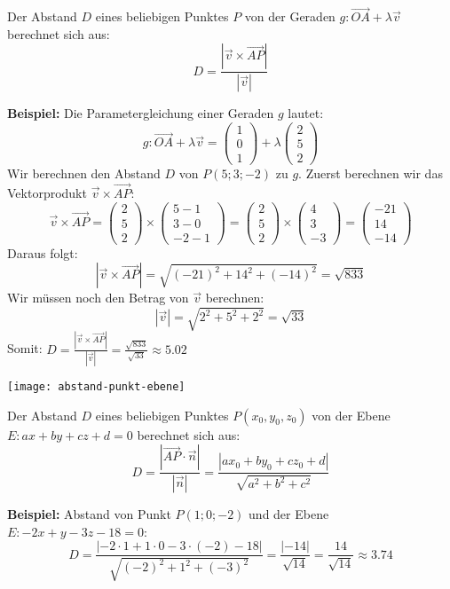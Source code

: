 Der Abstand $D$ eines beliebigen Punktes $P$ von der Geraden $g: \vec{OA} + \lambda \vec{v}$ berechnet sich aus:
\[D = \frac{|\vec{v} \times \vec{AP}|}{|\vec{v}|}\]

\textbf{Beispiel:}
Die Parametergleichung einer Geraden $g$ lautet:
\[g: \vec{OA} + \lambda \vec{v} = \left(
\begin{array}{c}
    1 \\ 0 \\ 1
\end{array}
\right) + \lambda \left(
\begin{array}{c}
    2 \\ 5 \\ 2
\end{array}
\right)\]
Wir berechnen den Abstand $D$ von $P(5;3;-2)$ zu $g$.
Zuerst berechnen wir das Vektorprodukt $\vec{v} \times \vec{AP}$:
\[\vec{v} \times \vec{AP} = \left(
\begin{array}{c}
    2 \\ 5 \\ 2
\end{array}
\right) \times \left(
\begin{array}{c}
    5 - 1 \\
    3 - 0 \\
    -2 - 1
\end{array}
\right) = \left(
\begin{array}{c}
    2 \\ 5 \\ 2
\end{array}
\right) \times \left(
\begin{array}{c}
    4 \\ 3 \\ -3
\end{array}
\right) = \left(
\begin{array}{c}
    -21 \\ 14 \\ -14
\end{array}
\right)\]
Daraus folgt:
\[|\vec{v} \times \vec{AP}| = \sqrt{(-21)^2 + 14^2 + (-14)^2} = \sqrt{833}\]
Wir müssen noch den Betrag von $\vec{v}$ berechnen:
\[|\vec{v}| = \sqrt{2^2 + 5^2 + 2^2} = \sqrt{33}\]
Somit: $D = \frac{|\vec{v} \times \vec{AP}|}{|\vec{v}|} = \frac{\sqrt{833}}{\sqrt{33}} \approx 5.02$


\begin{center}
    \texttt{[image: abstand-punkt-ebene]}
\end{center}

Der Abstand $D$ eines beliebigen Punktes $P(x_0, y_0, z_0)$ von der Ebene $E: ax + by + cz + d = 0$ berechnet sich aus:
\[D = \frac{|\vec{AP} \cdot \vec{n}|}{|\vec{n}|} = \frac{|a x_0 + b y_0 + c z_0 + d|}{\sqrt{a^2 + b^2 + c^2}}\]

\textbf{Beispiel:} Abstand von Punkt $P(1;0;-2)$ und der Ebene $E\colon -2x + y - 3z - 18 = 0$:
\[D = \frac{|-2 \cdot 1 + 1 \cdot 0 - 3 \cdot (-2) -18|}{\sqrt{(-2)^2 + 1^2 + (-3)^2}} = \frac{|-14|}{\sqrt{14}} = \frac{14}{\sqrt{14}} \approx 3.74\]